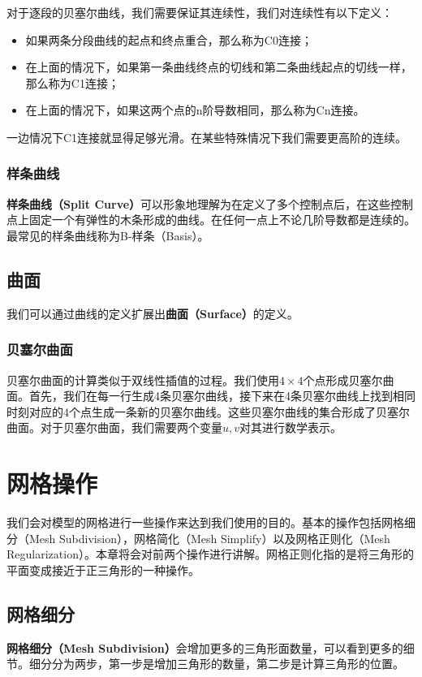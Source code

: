 \documentclass[openany]{progbookcn}
\begin{document}
对于逐段的贝塞尔曲线，我们需要保证其连续性，我们对连续性有以下定义：
\begin{itemize}
	\item 如果两条分段曲线的起点和终点重合，那么称为C0连接；
	\item 在上面的情况下，如果第一条曲线终点的切线和第二条曲线起点的切线一样，那么称为C1连接；
	\item 在上面的情况下，如果这两个点的n阶导数相同，那么称为Cn连接。
\end{itemize}
一边情况下C1连接就显得足够光滑。在某些特殊情况下我们需要更高阶的连续。

\subsection{样条曲线}
\textbf{样条曲线（Split Curve）}可以形象地理解为在定义了多个控制点后，在这些控制点上固定一个有弹性的木条形成的曲线。在任何一点上不论几阶导数都是连续的。最常见的样条曲线称为B-样条（Basis）。

\section{曲面}
我们可以通过曲线的定义扩展出\textbf{曲面（Surface）}的定义。

\subsection{贝塞尔曲面}
贝塞尔曲面的计算类似于双线性插值的过程。我们使用$4\times 4$个点形成贝塞尔曲面。首先，我们在每一行生成4条贝塞尔曲线，接下来在4条贝塞尔曲线上找到相同时刻对应的4个点生成一条新的贝塞尔曲线。这些贝塞尔曲线的集合形成了贝塞尔曲面。对于贝塞尔曲面，我们需要两个变量$u,v$对其进行数学表示。

\chapter{网格操作}
我们会对模型的网格进行一些操作来达到我们使用的目的。基本的操作包括网格细分（Mesh Subdivision），网格简化（Mesh Simplify）以及网格正则化（Mesh Regularization）。本章将会对前两个操作进行讲解。网格正则化指的是将三角形的平面变成接近于正三角形的一种操作。

\section{网格细分}
\textbf{网格细分（Mesh Subdivision）}会增加更多的三角形面数量，可以看到更多的细节。细分分为两步，第一步是增加三角形的数量，第二步是计算三角形的位置。
\end{document}
